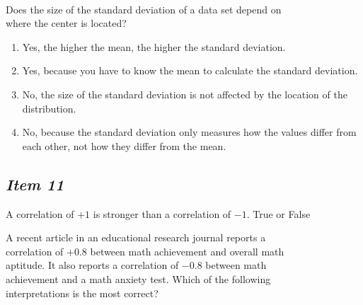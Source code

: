 \vspace{8pt}





\noindent{} \\


Does the size of the standard deviation of a data set depend on \\ \indent where the center is located?


\begin{enumerate} [leftmargin=1.5cm, itemsep=.2em]


\item Yes, the higher the mean, the higher the standard deviation.


\item Yes, because you have to know the mean to calculate the standard deviation.


\item No, the size of the standard deviation is not affected by the location of the distribution.


\item No, because the standard deviation only measures how the values differ from each other, not how they differ from the mean.


\end{enumerate}








\subsection{\textbf{\textit{Item 11}}}


A correlation of $+1$ is stronger than a correlation of $-1$. True or False\\


\vspace{8pt}





\noindent{}





A recent article in an educational research journal reports a \\ correlation of $+0.8$ between math achievement and overall math \\ aptitude. It also reports a correlation of $-0.8$ between math\\ achievement and a math anxiety test. Which of the following\\ interpretations is the most correct?



